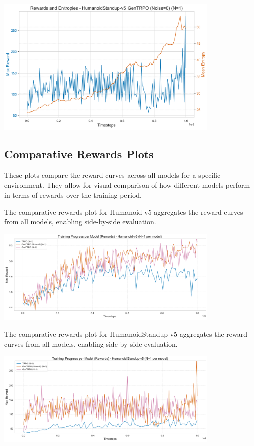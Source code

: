 \documentclass{svproc}
\begin{document}
\begin{center}
\includegraphics[width=0.8\textwidth]{graph_HumanoidStandup-v5_gentrpo_rewards_entropies.png}
\end{center}

\subsection{Comparative Rewards Plots}
These plots compare the reward curves across all models for a specific environment. They allow for visual comparison of how different models perform in terms of rewards over the training period.

The comparative rewards plot for Humanoid-v5 aggregates the reward curves from all models, enabling side-by-side evaluation.

\begin{center}
\includegraphics[width=0.8\textwidth]{graph_Humanoid-v5_models_rewards.png}
\end{center}

The comparative rewards plot for HumanoidStandup-v5 aggregates the reward curves from all models, enabling side-by-side evaluation.

\begin{center}
\includegraphics[width=0.8\textwidth]{graph_HumanoidStandup-v5_models_rewards.png}
\end{center}
\end{document}
